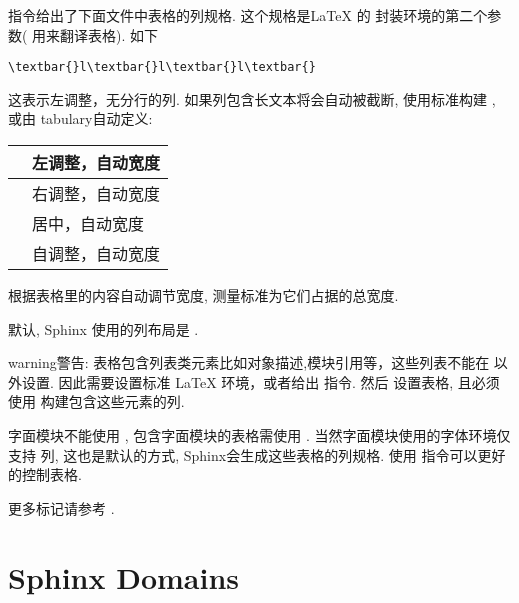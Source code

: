 \documentclass[letterpaper,10pt,english]{sphinxmanual}
\begin{document}
\begin{fulllineitems}
\label{markup/misc:directive-tabularcolumns}
指令给出了下面文件中表格的列规格.
这个规格是LaTeX 的  封装环境的第二个参数(  用来翻译表格).
如下

\begin{Verbatim}[commandchars=\\\{\}]
\textbar{}l\textbar{}l\textbar{}l\textbar{}
\end{Verbatim}

这表示左调整，无分行的列.  如果列包含长文本将会自动被截断,
使用标准构建  , 或由 tabulary自动定义:

\begin{tabulary}{\linewidth}{|L|L|}
\hline

 & 
左调整，自动宽度
\\
\hline
{}
 & 
右调整，自动宽度
\\
\hline
{}
 & 
居中，自动宽度
\\
\hline
{}
 & 
自调整，自动宽度
\\
\hline\end{tabulary}


根据表格里的内容自动调节宽度, 测量标准为它们占据的总宽度.

默认, Sphinx 使用的列布局是  .


\end{fulllineitems}


\begin{notice}{warning}{警告:}
表格包含列表类元素比如对象描述,模块引用等，这些列表不能在  以外设置.
因此需要设置标准 LaTeX  环境，或者给出  指令.
然后  设置表格, 且必须使用  构建包含这些元素的列.

字面模块不能使用  , 包含字面模块的表格需使用 .
当然字面模块使用的字体环境仅支持  列, 这也是默认的方式, Sphinx会生成这些表格的列规格.
使用 {\hyperref[markup/misc:directive\string-tabularcolumns]{}} 指令可以更好的控制表格.
\end{notice}

更多标记请参考 {\hyperref[domains:domains]{}}.


\chapter{Sphinx Domains}
\label{domains:sphinx-domains}\label{domains:standard-rest-markup}\label{domains:domains}\label{domains::doc}
\end{document}
